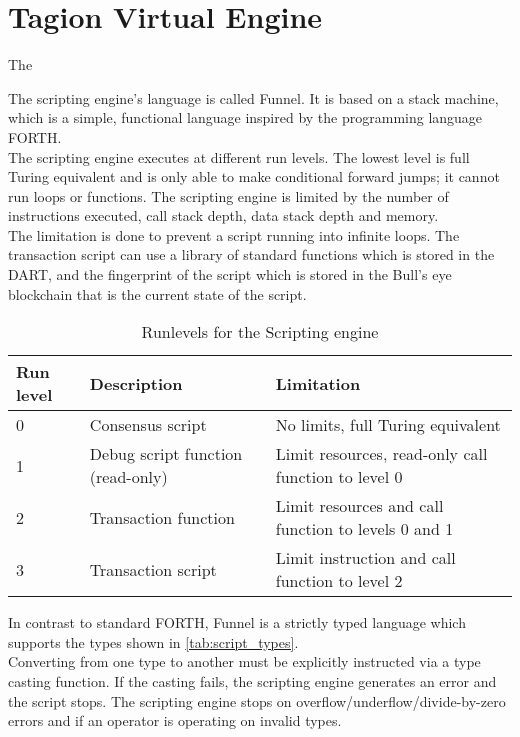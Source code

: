 \section{Tagion Virtual Engine}
The 

The scripting engine's language is called Funnel. It is based on a stack machine, which is a simple, functional language inspired by the programming language FORTH. \\
The scripting engine executes at different run levels. The lowest level is full Turing equivalent and is only able to make conditional forward jumps; it cannot run loops or functions. The scripting engine is limited by the number of instructions executed, call stack depth, data stack depth and memory. \\

The limitation is done to prevent a script running into infinite loops. The transaction script can use a library of standard functions which is stored in the DART, and the fingerprint of the script which is stored in the Bull’s eye blockchain that is the current state of the script.


\begin{table}[H]
 \begin{center}
\begin{tabular}{|p{1cm}|p{3.5cm}|l|}
\hline
Run level & Description & Limitation \\
\hline
0 & Consensus script & No limits, full Turing equivalent \\
\hline
1 & Debug script function (read-only) & Limit resources, read-only call function to level 0 \\
\hline
2 & Transaction function & Limit resources and call function to levels 0 and 1 \\
\hline
3 & Transaction script & Limit instruction and call function to level 2 \\
\hline
\end{tabular}
\end{center}
\caption{Runlevels for the Scripting engine}
\label{tab:script_runlevl}
\end{table}

In contrast to standard FORTH, Funnel is a strictly typed language which supports the types shown in \cref{tab:script_types}.\\
Converting from one type to another must be explicitly instructed via a type casting function. If the casting fails, the scripting engine generates an error and the script stops. The scripting engine stops on overflow/underflow/divide-by-zero errors and if an operator is operating on invalid types.

